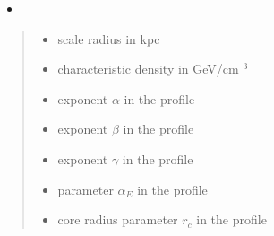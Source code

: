 \documentclass[letterpaper,10pt,english]{sphinxmanual}
\begin{document}
\begin{fulllineitems}
\begin{quote}
\begin{description}
\end{description}\end{quote}
\begin{itemize}
\item {} 
\sphinxAtStartPar
{}

\end{itemize}
\begin{quote}\begin{description}
\begin{itemize}
\item {} 
\sphinxAtStartPar
{} \textendash{} scale radius in kpc

\item {} 
\sphinxAtStartPar
{} \textendash{} characteristic density in GeV/cm \({}^3\)

\item {} 
\sphinxAtStartPar
{} \textendash{} exponent \(\alpha\) in the {\hyperref[\detokenize{diffsph.profiles:diffsph.profiles.templates.hdz}]{}} profile

\item {} 
\sphinxAtStartPar
{} \textendash{} exponent \(\beta\) in the {\hyperref[\detokenize{diffsph.profiles:diffsph.profiles.templates.hdz}]{}} profile

\item {} 
\sphinxAtStartPar
{} \textendash{} exponent \(\gamma\) in the {\hyperref[\detokenize{diffsph.profiles:diffsph.profiles.templates.hdz}]{}} profile

\item {} 
\sphinxAtStartPar
{} \textendash{} parameter \(\alpha_E\) in the {\hyperref[\detokenize{diffsph.profiles:diffsph.profiles.templates.enst}]{}} profile

\item {} 
\sphinxAtStartPar
{} \textendash{} core radius parameter \(r_c\) in the {\hyperref[\detokenize{diffsph.profiles:diffsph.profiles.templates.cnfw}]{}} profile


\end{itemize}
\end{description}
\end{quote}
\end{fulllineitems}
\end{document}
